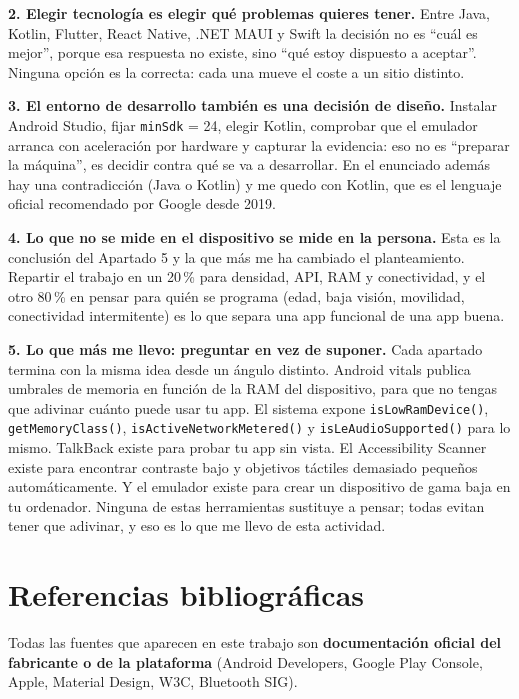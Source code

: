 \documentclass[11pt,a4paper]{article}
\newcommand{\code}[1]{\texttt{\color{primary}#1}}
\begin{document}
	\textbf{2. Elegir tecnología es elegir qué problemas quieres tener.} Entre Java, Kotlin, Flutter, React Native, .NET MAUI y Swift la decisión no es \enquote{cuál es mejor}, porque esa respuesta no existe, sino \enquote{qué estoy dispuesto a aceptar}. Ninguna opción es la correcta: cada una mueve el coste a un sitio distinto.
	
	\textbf{3. El entorno de desarrollo también es una decisión de diseño.} Instalar Android Studio, fijar \code{minSdk} = 24, elegir Kotlin, comprobar que el emulador arranca con aceleración por hardware y capturar la evidencia: eso no es \enquote{preparar la máquina}, es decidir contra qué se va a desarrollar. En el enunciado además hay una contradicción (Java o Kotlin) y me quedo con Kotlin, que es el lenguaje oficial recomendado por Google desde 2019.
	
	\textbf{4. Lo que no se mide en el dispositivo se mide en la persona.} Esta es la conclusión del Apartado 5 y la que más me ha cambiado el planteamiento. Repartir el trabajo en un 20\,\% para densidad, API, RAM y conectividad, y el otro 80\,\% en pensar para quién se programa (edad, baja visión, movilidad, conectividad intermitente) es lo que separa una app funcional de una app buena.
	
	\textbf{5. Lo que más me llevo: preguntar en vez de suponer.} Cada apartado termina con la misma idea desde un ángulo distinto. Android vitals publica umbrales de memoria en función de la RAM del dispositivo, para que no tengas que adivinar cuánto puede usar tu app. El sistema expone \code{isLowRamDevice()}, \code{getMemoryClass()}, \code{isActiveNetworkMetered()} y \code{isLeAudioSupported()} para lo mismo. TalkBack existe para probar tu app sin vista. El Accessibility Scanner existe para encontrar contraste bajo y objetivos táctiles demasiado pequeños automáticamente. Y el emulador existe para crear un dispositivo de gama baja en tu ordenador. Ninguna de estas herramientas sustituye a pensar; todas evitan tener que adivinar, y eso es lo que me llevo de esta actividad.
	
	\newpage
	\section*{Referencias bibliográficas}
	
	Todas las fuentes que aparecen en este trabajo son \textbf{documentación oficial del fabricante o de la plataforma} (Android Developers, Google Play Console, Apple, Material Design, W3C, Bluetooth SIG).
	
\end{document}
